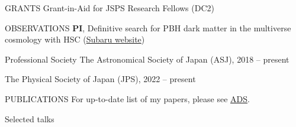 \documentclass{sty/resume} %
\begin{document}

\begin{rSection}{GRANTS}
    Grant-in-Aid for JSPS Research Fellows (DC2)
\end{rSection}

\begin{rSection}{OBSERVATIONS}
    \textbf{PI}, Definitive search for PBH dark matter in the multiverse cosmology with HSC (\href{https://subarutelescope.org/Observing/Schedule/S20B_abstract/S20B0032abst.html}{Subaru website})
\end{rSection}

\begin{rSection}{Professional Society}
    The Astronomical Society of Japan (ASJ), 2018 -- present

    The Physical Society of Japan (JPS), 2022 -- present
\end{rSection}

\clearpage
\begin{rSection}{PUBLICATIONS}
    For up-to-date list of my papers, please see \href{https://ui.adsabs.harvard.edu/search/filter_author_facet_hier_fq_author=AND&filter_author_facet_hier_fq_author=author_facet_hier%3A%221%2FSugiyama%2C%20S%2FSugiyama%2C%20Sunao%22&fq=%7B!type%3Daqp%20v%3D%24fq_author%7D&fq_author=(author_facet_hier%3A%221%2FSugiyama%2C%20S%2FSugiyama%2C%20Sunao%22)&q=pubdate%3A%5B2001-01%20TO%209999-12%5D%20author%3A(%22Sugiyama%2CSunao%22)&sort=date%20desc%2C%20bibcode%20desc&p_=0}{ADS}.
    \vspace{-19em}
    
    
\end{rSection}

\begin{rSection}{Selected talks}
    
\end{rSection}
\end{document}
